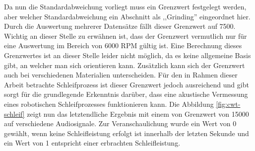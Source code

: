 Da nun die Standardabweichung vorliegt muss ein Grenzwert festgelegt werden, aber welcher Standardabweichung ein Abschnitt als ,,Grinding'' eingeordnet hier. Durch die Auswertung mehrerer Datensätze fällt dieser Grenzwert auf 7500. Wichtig an dieser Stelle zu erwähnen ist, dass der Grenzwert vermutlich nur für eine Auswertung im Bereich von 6000 RPM gültig ist. Eine Berechnung dieses Grenzwertes ist an dieser Stelle leider nicht möglich, da es keine allgemeine Basis gibt, an welcher man sich orientieren kann. Zusätzlich kann sich der Grenzwert auch bei verschiedenen Materialien unterscheiden. Für den in Rahmen dieser Arbeit betrachte Schleifprozess ist dieser Grenzwert jedoch ausreichend und gibt sorgt für die grundlegende Erkenntnis darüber, dass eine akustische Vermessung eines robotischen Schleifprozesses funktionieren kann. Die Abbildung \ref{fig:cwt-schleif} zeigt nun das letztendliche Ergebnis mit einem von Grenzwert von 15000 auf verschiedene Audiosignale. Zur Veranschaulichung wurde ein Wert von 0 gewählt, wenn keine Schleifleistung erfolgt ist innerhalb der letzten Sekunde und ein Wert von 1 entspricht einer erbrachten Schleifleistung.


